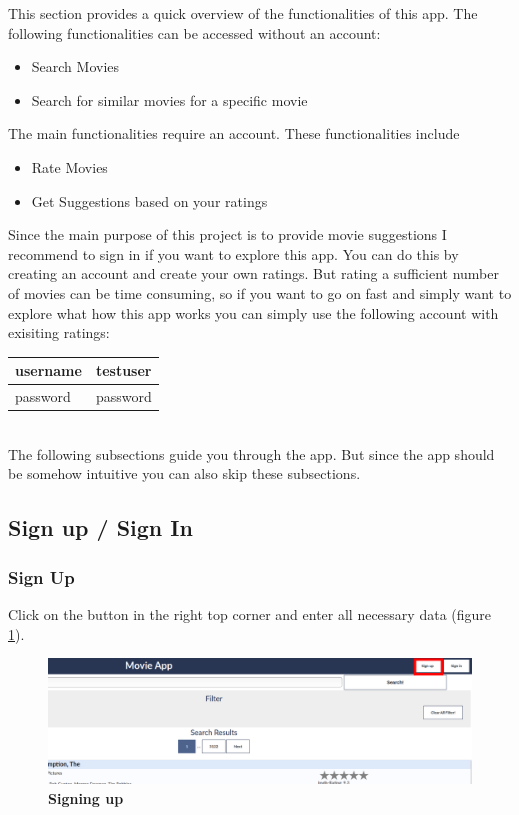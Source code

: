 \documentclass{article}
\begin{document}
This section provides a quick overview of the functionalities of this app. The following functionalities can be accessed without an account:

\begin{itemize}
	\item Search Movies
	\item Search for similar movies for a specific movie
\end{itemize}
The main functionalities require an account. These functionalities include

\begin{itemize}
	\item Rate Movies
	\item Get Suggestions based on your ratings
\end{itemize}
Since the main purpose of this project is to provide movie suggestions I recommend to sign in if you want to explore this app. You can do this by creating an account and create your own ratings. But rating a sufficient number of movies can be time consuming, so if you want to go on fast and simply want to explore what how this app works you can simply use the following account with exisiting ratings:\\

\begin{tabular}{|l|l|}
\hline
username & testuser \\
\hline password & password\\
\hline
\end{tabular}\\

The following subsections guide you through the app. But since the app should be somehow intuitive you can also skip these subsections.

\subsection{Sign up / Sign In}

\subsubsection{Sign Up}

Click on the button in the right top corner and enter all necessary data (figure \ref{fig_sign_up}).
\begin{figure}[t!]
\includegraphics[scale=0.3]{screenshots_app/sign_up.png}
\caption{\textbf{Signing up}}\label{fig_sign_up}
\end{figure}
\end{document}
